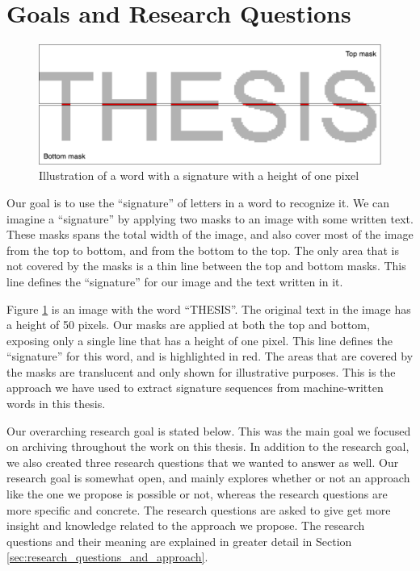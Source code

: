 
\section{Goals and Research Questions}
\label{sec:goals_and_research_questions}
\begin{figure}[ht]
    \centering
    \includegraphics[width=1.\textwidth]{fig/chapter1/signature2.png}
    \caption{Illustration of a word with a signature with a height of one pixel}
    \label{fig:thesis-signature}
\end{figure}

Our goal is to use the ``signature'' of letters in a word to recognize it. We can imagine a ``signature'' by applying two masks to an image with some written text. These masks spans the total width of the image, and also cover most of the image from the top to bottom, and from the bottom to the top. The only area that is not covered by the masks is a thin line between the top and bottom masks. This line defines the ``signature'' for our image and the text written in it. 

Figure \ref{fig:thesis-signature} is an image with the word ``THESIS''. The original text in the image has a height of 50 pixels. Our masks are applied at both the top and bottom, exposing only a single line that has a height of one pixel. This line defines the ``signature'' for this word, and is highlighted in red. The areas that are covered by the masks are translucent and only shown for illustrative purposes. This is the approach we have used to extract signature sequences from machine-written words in this thesis.

Our overarching research goal is stated below. This was the main goal we focused on archiving throughout the work on this thesis. In addition to the research goal, we also created three research questions that we wanted to answer as well. Our research goal is somewhat open, and mainly explores whether or not an approach like the one we propose is possible or not, whereas the research questions are more specific and concrete. The research questions are asked to give get more insight and knowledge related to the approach we propose. The research questions and their meaning are explained in greater detail in Section \ref{sec:research_questions_and_approach}.

